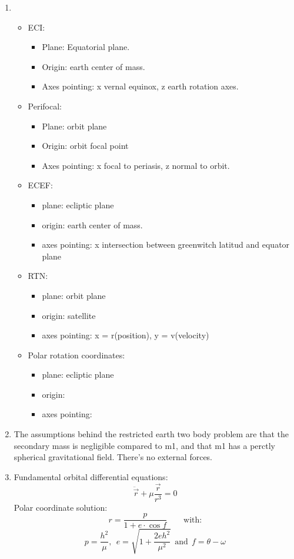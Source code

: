 \documentclass[a4paper]{article}
\begin{document}
\begin{enumerate}[label=\emph{\alph*)}]
  \item
    \begin{itemize}[label=\textbullet]
      \item ECI:
	\begin{itemize}
	  \item Plane: Equatorial plane.
	  \item Origin: earth center of mass.
	  \item Axes pointing: x vernal equinox, z earth rotation axes.
	\end{itemize}
      \item Perifocal:
	\begin{itemize}
	  \item Plane: orbit plane
	  \item Origin: orbit focal point
	  \item Axes pointing: x focal to periasis, z normal to orbit.
	\end{itemize}
      \item ECEF:
	\begin{itemize}
	  \item plane: ecliptic plane 
	  \item origin: earth center of mass.
	  \item axes pointing: x intersection between greenwitch latitud  and equator plane
	\end{itemize}
      \item RTN:
	\begin{itemize}
	  \item plane: orbit plane
	  \item origin: satellite
	  \item axes pointing: x = r(position), y = v(velocity)
	\end{itemize}
      \item Polar rotation coordinates:
	\begin{itemize}
	  \item plane: ecliptic plane
	  \item origin:
	  \item axes pointing:
	\end{itemize}
    \end{itemize}
  \item The assumptions behind the restricted earth two body problem are that the secondary mass is negligible compared to m1, and that m1 has a perctly spherical gravitational field. There's no external forces.
  \item Fundamental orbital differential equations:
    \[\ddot{\vec{r}}+\mu\frac{\vec{r}}{r^3}=0\]
    Polar coordinate solution:
    \[r = \frac{p}{1+e\cdot\cos{f}} \qquad \textrm{with:}\]
    \[p = \frac{h^2}{\mu},~~ e=\sqrt{1+\frac{2e h^2}{\mu^2}} ~~ \textrm{and} ~~ f=\theta-\omega\]
    

\end{enumerate}
\end{document}
